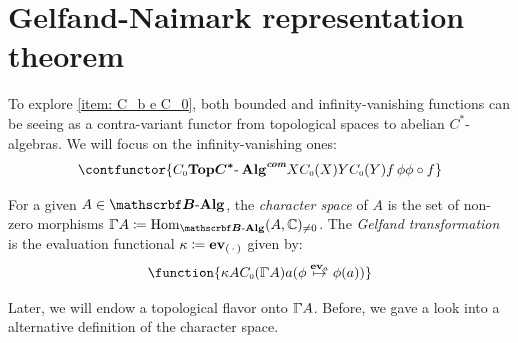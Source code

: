 \section{Gelfand-Naimark representation theorem}
To explore \ref{item: C_b e C_0}, both bounded and infinity-vanishing functions can be seeing as a contra-variant functor from topological spaces to abelian $C^*$-algebras. We will focus on the infinity-vanishing ones:  
\begin{equation*}
    \contfunctor{{\sub C0}{\Top}{\CstarCom}{X}{\sub C0(X)}{Y}{\sub C0(Y)}{f}{\,}{\phi}{\phi \circ f}}
\end{equation*}

\begin{definicao}
For a given $A\in \BAlg$, the \textit{character space} of $A$ is the set of non-zero morphisms ${{\GGamma}{A}} \coloneqq \Hom_{\BAlg}(A,\C)_{\neq 0}$. The \textit{Gelfand transformation} is the evaluation functional $\kappa \coloneqq \boldsymbol{\operatorname{ev}}_{(\,\cdot\,)}$ given by:
\begin{equation}
\label{eq: transformada de gelfand}
    \function{{\kappa}{A}{\sub C0({{\GGamma}{A}})}{a}{(\phi \overset{\ev_a}\mapsto \phi(a))}}
\end{equation}
\end{definicao}

Later, we will endow a topological flavor onto $\GGamma{A}$. Before, we gave a look into a alternative definition of the character space.

